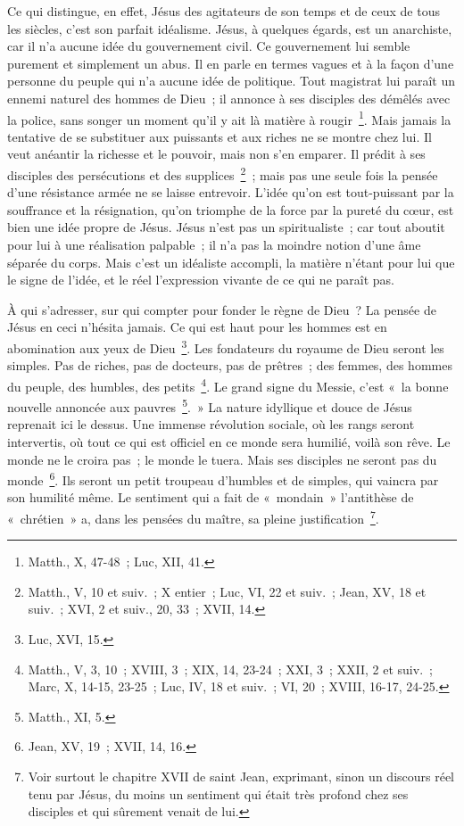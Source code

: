 \documentclass[french,twoside]{book} %
\newcommand\chapterclose{} %
\begin{document}
Ce qui distingue, en effet, Jésus des agitateurs de son temps et de ceux de tous les siècles, c’est son parfait idéalisme. Jésus, à quelques égards, est un anarchiste, car il n’a aucune idée du gouvernement civil. Ce gouvernement lui semble purement et simplement un abus. Il en parle en termes vagues et à la façon d’une personne du peuple qui n’a aucune idée de politique. Tout magistrat lui paraît un ennemi naturel des hommes de Dieu ; il annonce à ses disciples des démêlés avec la police, sans songer un moment qu’il y ait là matière à rougir \footnote{Matth., X, 47-48 ; Luc, XII, 41.}. Mais jamais la tentative de se substituer aux puissants et aux riches ne se montre chez lui. Il veut anéantir la richesse et le pouvoir, mais non s’en emparer. Il prédit à ses disciples des persécutions et des supplices \footnote{Matth., V, 10 et suiv. ; X entier ; Luc, VI, 22 et suiv. ; Jean, XV, 18 et suiv. ; XVI, 2 et suiv., 20, 33 ; XVII, 14.} ; mais pas une seule fois la pensée d’une résistance armée ne se laisse entrevoir. L’idée qu’on est tout-puissant par la souffrance et la résignation, qu’on triomphe de la force par la pureté du cœur, est bien une idée propre de Jésus. Jésus n’est pas un spiritualiste ; car tout aboutit pour lui à une réalisation palpable ; il n’a pas la moindre notion d’une âme séparée du corps. Mais c’est un idéaliste accompli, la matière n’étant pour lui que le signe de l’idée, et le réel l’expression vivante de ce qui ne paraît pas.\par
À qui s’adresser, sur qui compter pour fonder le règne de Dieu ? La pensée de Jésus en ceci n’hésita jamais. Ce qui est haut pour les hommes est en abomination aux yeux de Dieu \footnote{Luc, XVI, 15.}. Les fondateurs du royaume de Dieu seront les simples. Pas de riches, pas de docteurs, pas de prêtres ; des femmes, des hommes du peuple, des humbles, des petits \footnote{Matth., V, 3, 10 ; XVIII, 3 ; XIX, 14, 23-24 ; XXI, 3 ; XXII, 2 et suiv. ; Marc, X, 14-15, 23-25 ; Luc, IV, 18 et suiv. ; VI, 20 ; XVIII, 16-17, 24-25.}. Le grand signe du Messie, c’est « la bonne nouvelle annoncée aux pauvres \footnote{Matth., XI, 5.}. » La nature idyllique et douce de Jésus reprenait ici le dessus. Une immense révolution sociale, où les rangs seront intervertis, où tout ce qui est officiel en ce monde sera humilié, voilà son rêve. Le monde ne le croira pas ; le monde le tuera. Mais ses disciples ne seront pas du monde \footnote{Jean, XV, 19 ; XVII, 14, 16.}. Ils seront un petit troupeau d’humbles et de simples, qui vaincra par son humilité même. Le sentiment qui a fait de « mondain » l’antithèse de « chrétien » a, dans les pensées du maître, sa pleine justification \footnote{ Voir surtout le chapitre XVII de saint Jean, exprimant, sinon un discours réel tenu par Jésus, du moins un sentiment qui était très profond chez ses disciples et qui sûrement venait de lui.}.
\chapterclose
\end{document}
